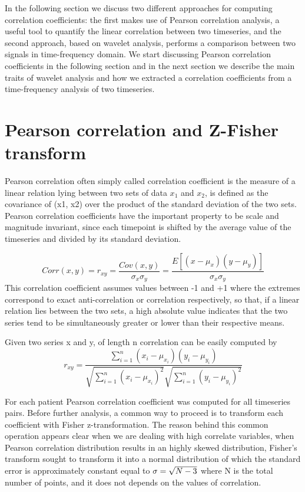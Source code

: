 \documentclass[10pt]{report}
\begin{document}
In the following section we discuss two different approaches for computing correlation coefficients: the first makes use of Pearson correlation analysis, a useful tool to quantify the linear correlation between two timeseries, and the second approach, based on wavelet analysis, performs a comparison between two signals in time-frequency domain.
We start discussing Pearson correlation coefficients in the following section and in the next section we describe the main traits of wavelet analysis and how we extracted a correlation coefficients from a time-frequency analysis of two timeseries.

\section{Pearson correlation and Z-Fisher transform}
Pearson correlation often simply called correlation coefficient is the measure of a linear relation lying between two sets of data $x_1$ and $x_2$, is defined as the covariance of (x1, x2) over the product of the standard deviation of the two sets.
Pearson correlation coefficients have the important property to be scale and magnitude invariant, since each timepoint is shifted by the average value of the timeseries and divided by its standard deviation.

\begin{equation}
Corr(x, y) = r_{xy}=  \frac{Cov\left( x, y\right)}{\sigma_x \sigma_y} = \frac{E\left[ \left( x - \mu_x \right) \left( y - \mu_y \right)\right]}{\sigma_{x} \sigma_{y}}
\end{equation}
This correlation coefficient assumes values between -1 and +1 where the extremes correspond to exact anti-correlation or correlation respectively, so that, if a linear relation lies between the two sets, a high absolute value indicates that the two series tend to be simultaneously greater or lower than their respective means. \cite{baldini2021}

Given two series x and y, of length n correlation can be easily computed by
\begin{equation}
r_{xy} = \frac{\sum_{i = 1}^n \left( x_i - \mu_{x_i}\right)\left( y_i - \mu_{y_i}\right)}{\sqrt{\sum_{i = 1}^n \left( x_i -\mu_{x_i}\right)^2}\sqrt{\sum_{i = 1}^n \left( y_i -\mu_{y_i}\right)^2}}
\end{equation}

For each patient Pearson correlation coefficient was computed for all timeseries pairs. Before further analysis, a common way to proceed is to transform each coefficient with Fisher z-transformation.\cite{spera-2019}
The reason behind this common operation appears clear when we are dealing with high correlate variables, when Pearson correlation distribution results in an highly skewed distribution, Fisher's transform sought to transform it into a normal distribution of which the standard error is approximately constant equal to $\sigma = \/\sqrt{N-3}$ where N is the total number of points, and it does not depends on the values of correlation.\cite{wicklin2017}
\end{document}
